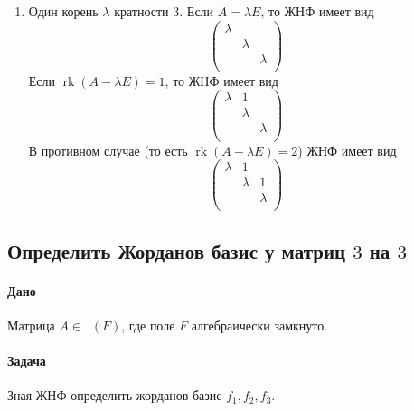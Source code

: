 \documentclass{article}
\newcommand{\Matrix}[2]{\mathop{\mathrm{M}_{#2}}(#1)}
\newcommand{\rk}{\operatorname{rk}}
\begin{document}
\begin{enumerate}
\item Один корень $\lambda$ кратности $3$. Если $A = \lambda E$, то ЖНФ имеет вид
\[
\begin{pmatrix}
{\lambda}&{}&{}\\
{}&{\lambda}&{}\\
{}&{}&{\lambda}\\
\end{pmatrix}
\]
Если $\rk(A-\lambda E) = 1$, то ЖНФ имеет вид
\[
\begin{pmatrix}
{\lambda}&{1}&{}\\
{}&{\lambda}&{}\\
{}&{}&{\lambda}\\
\end{pmatrix}
\]
В противном случае (то есть $\rk(A - \lambda E) = 2$) ЖНФ имеет вид
\[
\begin{pmatrix}
{\lambda}&{1}&{}\\
{}&{\lambda}&{1}\\
{}&{}&{\lambda}\\
\end{pmatrix}
\]
\end{enumerate}

\subsection{Определить Жорданов базис у матриц $3$ на $3$}

\paragraph{Дано} Матрица $A \in \Matrix{F}{3}$, где поле $F$ алгебраически замкнуто.

\paragraph{Задача} Зная ЖНФ определить жорданов базис $f_1, f_2, f_3$.
\end{document}
